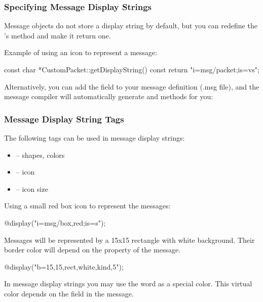 \subsubsection{Specifying Message Display Strings}

Message objects do not store a display string by default, but you can redefine
the 's  method and make it return
one.

Example of using an icon to represent a message:

\begin{cpp}
const char *CustomPacket::getDisplayString() const
{
    return "i=msg/packet;is=vs";
}
\end{cpp}

Alternatively, you can add the field  to your message
definition (.msg file), and the message compiler will automatically generate
 and  methods for you:

\begin{msg}
message Job
{
    string displayString = "i=msg/package_s,kind";
...
\end{msg}

\subsubsection{Message Display String Tags}

The following tags can be used in message display strings:
\begin{itemize}
  \item{ -- shapes, colors}
  \item{ -- icon}
  \item{ -- icon size}
\end{itemize}

Using a small red box icon to represent the messages:

\begin{ned}
@display("i=msg/box,red;is=s");
\end{ned}

Messages will be represented by a 15x15 rectangle with white background.
Their border color will depend on the  property of the message.

\begin{ned}
@display("b=15,15,rect,white,kind,5");
\end{ned}

\begin{note}
   In message display strings you may use the word  as a special color.
   This virtual color depends on the  field in the message.
\end{note}

